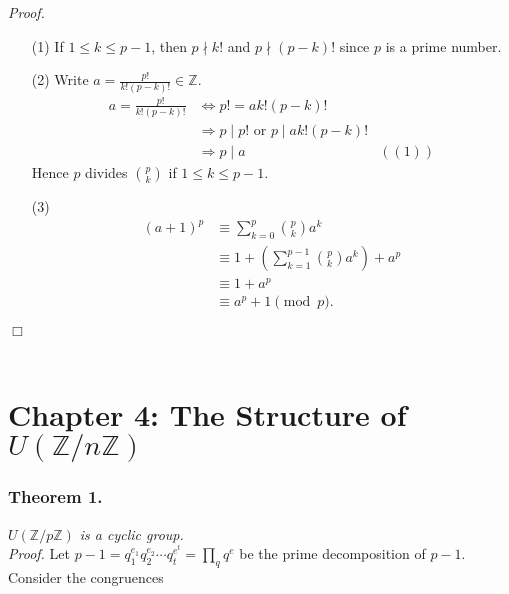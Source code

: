 \documentclass{article}
\begin{document}
\emph{Proof.}
\begin{enumerate}
  \item[(1)]
  If $1 \leq k \leq p-1$, then $p \nmid k!$ and $p \nmid (p-k)!$
  since $p$ is a prime number.
  \item[(2)]
  Write $a = \frac{p!}{k!(p-k)!} \in \mathbb{Z}$.
  \begin{align*}
  a = \frac{p!}{k!(p-k)!}
  &\Longleftrightarrow
  p! = ak!(p-k)! \\
  &\Longrightarrow
  p \mid p! \text{ or } p \mid ak!(p-k)! \\
  &\Longrightarrow
  p \mid a
    &((1))
  \end{align*}
  Hence $p$ divides ${p \choose k}$ if $1 \leq k \leq p-1$.
  \item[(3)]
  \begin{align*}
  (a+1)^p
  &\equiv \sum_{k=0}^{p} {p \choose k} a^k \\
  &\equiv 1 + \left( \sum_{k=1}^{p-1} {p \choose k} a^k \right) + a^p \\
  &\equiv 1 + a^p \\
  &\equiv a^p + 1 \pmod{p}.
  \end{align*}
\end{enumerate}
$\Box$\\\\






\newpage
\section*{Chapter 4: The Structure of $U(\mathbb{Z}/n\mathbb{Z})$ \\}



\subsubsection*{Theorem 1.}
\emph{$U(\mathbb{Z}/p\mathbb{Z})$ is a cyclic group.} \\



\emph{Proof.}
Let $p - 1 = q_1^{e_1} q_2^{e_2} \cdots q_t^{e^t} = \prod_{q} q^e$ be the prime
decomposition of $p - 1$. Consider the congruences
\end{document}
